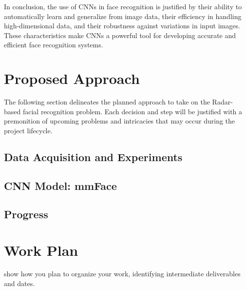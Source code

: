\documentclass{interim}
\begin{document}
In conclusion, the use of CNNs in face recognition is justified by their ability to automatically learn and generalize from image data, their efficiency in handling high-dimensional data, and their robustness against variations in input images. These characteristics make CNNs a powerful tool for developing accurate and efficient face recognition systems.


\section{Proposed Approach}
The following section delineates the planned approach to take on the Radar-based facial recognition problem. Each decision and step will be justified with a premonition of upcoming problems and intricacies that may occur during the project lifecycle.

\subsection{Data Acquisition and Experiments}


\subsection{CNN Model: mmFace}


\subsection{Progress}


\section{Work Plan}
show how you plan to organize your work, identifying intermediate deliverables and dates.



\end{document}
